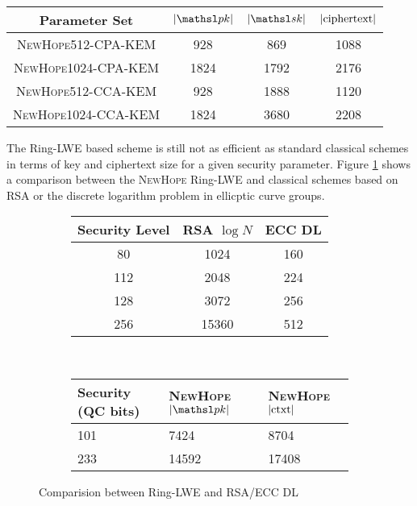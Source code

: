\begin{table}[h]
    \centering
    \begin{tabular}{|c|c|c|c|}
    \hline
    Parameter Set & $\abs{\pk}$ & $\abs{\sk}$ & ${\displaystyle \left| {\textnormal{ciphertext}} \right| }$\\
    \hline
    \hline
    \textsc{NewHope512-CPA-KEM} & 928 & 869 & 1088\\
    \hline
    \textsc{NewHope1024-CPA-KEM} & 1824 & 1792 & 2176\\
    \hline
    \scshape{NewHope512-CCA-KEM} & 928 & 1888 & 1120\\
    \hline
    \scshape{NewHope1024-CCA-KEM} & 1824 & 3680 & 2208\\
    \hline
    \end{tabular}
    \caption{}
    \label{table:LWE Table}
\end{table}

\noindent The Ring-LWE based scheme is still not as efficient as standard classical schemes in terms of key and ciphertext size for a given security parameter. Figure \ref{fig:ringlwe comparison} shows a comparison between the \textsc{NewHope} Ring-LWE and classical schemes based on RSA or the discrete logarithm problem in ellicptic curve groups. 
\begin{figure}[h!]
    \centering
    \begin{subfigure}[h]{0.5\textwidth}
            \centering
            \begin{tabular}{|c|c|c|}
            \hline
            Security Level & RSA $\log N$ & ECC DL\\
            \hline
            \hline
            80 & 1024 & 160\\
            \hline
            112 & 2048 & 224\\
            \hline
            128 & 3072 & 256\\
            \hline
            256 & 15360 & 512\\
            \hline
            \end{tabular}
    \end{subfigure}
    ~
    \begin{subfigure}[h]{0.4\textwidth}
            \centering
            \begin{tabular}{|p{20mm}|p{20mm}|p{20mm}|}
            \hline
            Security (QC bits) & \textsc{NewHope} $\abs{\pk}$ & \textsc{NewHope} ${\displaystyle \left| {\textnormal{ctxt}} \right| }$ \\
            \hline
            \hline
            101 & 7424 & 8704\\
            \hline
            233 & 14592 & 17408\\
            \hline
            \end{tabular}
    \end{subfigure}
    \caption{Comparision between Ring-LWE and RSA/ECC DL}
    \label{fig:ringlwe comparison}
\end{figure}

\newpage